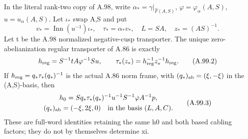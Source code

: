 In the literal rank-two copy of A.98, write
\(\alpha_* =\gamma|_{\widehat F(A,S)}\),
\(\varphi=\varphi_\alpha(A,S)\), \(u=u_\alpha(A,S)\).
Let \(\iota_*\) swap A,S and put
\[
 v_*=\operatorname{Inn}(u^{-1})\iota_*,\quad
 \tau_*=\alpha_*v_*,\quad L=SA,\quad z_*=(AS)^{-1}.
 \tag{A.99.1}
\]
Let t be the A.98 normalized negative-cusp transporter. The unique
zero-abelianization regular transporter of A.86 is exactly
\[
 h_{\rm reg}=S^{-1}tA\varphi^{-1}Su,
 \qquad \tau_*(z_*)=h_{\rm reg}^{-1}z_*^{-1}h_{\rm reg}.
 \tag{A.99.2}
\]
If \(h_{\rm reg}=q_*\tau_*(q_*)^{-1}\) is the actual A.86 norm
frame, with \((q_*)_{\rm ab}=(\xi,-\xi)\) in the (A,S)-basis,
then
\[
\begin{gathered}
 h_0=S q_*\tau_*(q_*)^{-1}u^{-1}S^{-1}
                  \varphi A^{-1}p,\\
 (q_*)_{\rm ab}=(-\xi,2\xi,0)
                    \quad\hbox{in the basis }(L,A,C).
\end{gathered}
\tag{A.99.3}
\]
These are full-word identities retaining the same h0 and both based
cabling factors; they do not by themselves determine xi.

